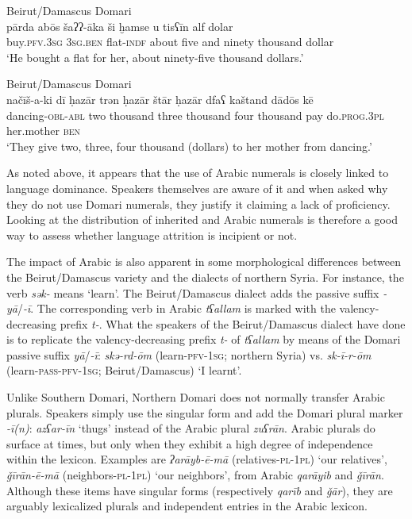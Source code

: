 \documentclass[output=paper]{langsci/langscibook}
\begin{document}
\ea
{Beirut/Damascus Domari}\\ \label{parda}
\gll pārda abōs šaʔʔ-āka ši ḫamse u tisʕīn alf dolar\\
     buy.\textsc{pfv.3sg} \textsc{3sg.ben} flat\textsc{{}-indf} about five and ninety thousand dollar\\
\glt ‘He bought a flat for her, about ninety-five thousand dollars.’
\z

\ea\label{ex:key:} \label{nacis}
{Beirut/Damascus Domari}\\
\gll načīš-a-ki dī ḥazār trən ḥazār štār ḥazār dfaʕ kaštand dādōs kē\\
     dancing-\textsc{obl-abl} two thousand three thousand four thousand pay do.\textsc{prog.3pl} her.mother \textsc{ben}\\
\glt ‘They give two, three, four thousand (dollars) to her mother from dancing.’
\z

As noted above, it appears that the use of Arabic numerals is closely linked to language dominance. Speakers themselves are aware of it and when asked why they do not use Domari numerals, they justify it claiming a lack of proficiency. Looking at the distribution of inherited and Arabic numerals is therefore a good way to assess whether language attrition is incipient or not.

The impact of Arabic is also apparent in some morphological differences between the Beirut/Damascus variety and the dialects of northern Syria. For instance, the verb \textit{sək-} means ‘learn’. The Beirut/Damascus dialect adds the passive suffix \textit{-yā}/\textit{-ī}. The corresponding verb in Arabic \textit{tʕallam} is marked with the valency-decreasing prefix \textit{t-}. What the speakers of the Beirut/Damascus dialect have done is to replicate the valency-decreasing prefix \textit{t-} of \textit{tʕallam} by means of the Domari passive suffix  \textit{yā}/\textit{{}-ī}: \textit{skə-rd-ōm} (learn-\textsc{pfv-1sg}; northern Syria) vs. \textit{sk-ī-r-ōm} (learn-\textsc{pass-pfv-1sg}; Beirut/Damascus) ‘I learnt’.

Unlike Southern Domari, Northern Domari does not normally transfer Arabic plurals. Speakers simply use the singular form and add the Domari plural marker \textit{-ī(n)}:  \textit{azʕar-īn} ‘thugs’ instead of the Arabic plural \textit{zuʕrān}. Arabic plurals do surface at times, but only when they exhibit a high degree of independence within the lexicon. Examples are \textit{ʔarāyb-ē-mā} (relatives-\textsc{pl-1pl}) ‘our relatives’, \textit{\v{g}īrān-ē-mā} (neighbors-\textsc{pl-1pl}) ‘our neighbors’, from Arabic \textit{qarāyib} and \textit{\v{g}īrān}. Although these items have singular forms (respectively \textit{qarīb} and \textit{\v{g}ār}), they are arguably lexicalized plurals and independent entries in the Arabic lexicon.
\end{document}
